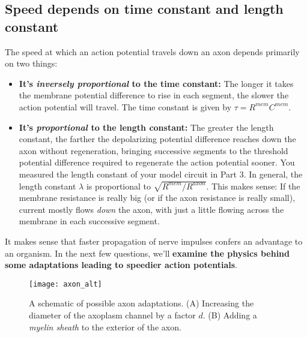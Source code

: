 \subsection*{Speed depends on time constant and length constant}
The speed at which an action potential travels down an axon depends primarily on two things:
\begin{itemize}
\itemsep-0.2em
\item \textbf{It's \emph{inversely proportional} to the time constant:} The longer it takes the membrane potential difference to rise in each segment, the slower the action potential will travel. The time constant is given by $\tau = R^{mem}C^{mem}$.
\item \textbf{It's \emph{proportional} to the length constant:} The greater the length constant, the farther the depolarizing potential difference reaches down the axon without regeneration, bringing successive segments to the threshold potential difference required to regenerate the action potential sooner. You measured the length constant of your model circuit in Part 3. In general, the length constant $\lambda$ is proportional to $\sqrt{R^{mem}/R^{axon}}$. This makes sense: If the membrane resistance is really big (or if the axon resistance is really small), current mostly flows \emph{down} the axon, with just a little flowing across the membrane in each successive segment.
\end{itemize}
It makes sense that faster propagation of nerve impulses confers an advantage to an organism.
In the next few questions, we'll \textbf{examine the physics behind some adaptations leading to speedier action potentials}.

\begin{figure}[hbtp]
	\centering
	\texttt{[image: axon\_alt]}
	\caption{A schematic of possible axon adaptations. (A) Increasing the diameter of the axoplasm channel by a factor $d$. (B) Adding a \emph{myelin sheath} to the exterior of the axon.}
	\label{fig:axon_alt}
	\vspace{-20pt}
\end{figure}

